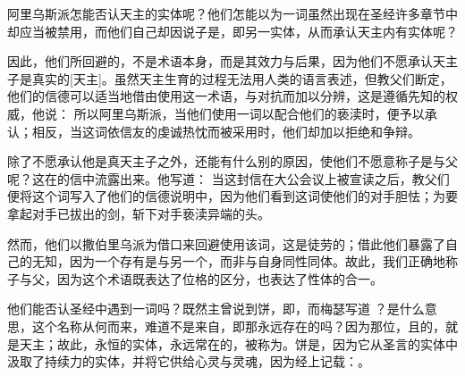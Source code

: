 阿里乌斯派怎能否认天主的实体呢？他们怎能以为一词虽然出现在圣经许多章节中却应当被禁用，而他们自己却因说子是，即另一实体，从而承认天主内有实体呢？\par

因此，他们所回避的，不是术语本身，而是其效力与后果，因为他们不愿承认天主子是真实的[天主]。虽然天主生育的过程无法用人类的语言表述，但教父们断定，他们的信德可以适当地借由使用这一术语，与对抗而加以分辨，这是遵循先知的权威，他说：  所以阿里乌斯派，当他们使用一词以配合他们的亵渎时，便予以承认；相反，当这词依信友的虔诚热忱而被采用时，他们却加以拒绝和争辩。\par

除了不愿承认他是真天主子之外，还能有什么别的原因，使他们不愿意称子是与父呢？这在的信中流露出来。他写道： 当这封信在大公会议上被宣读之后，教父们便将这个词写入了他们的信德说明中，因为他们看到这词使他们的对手胆怯；为要拿起对手已拔出的剑，斩下对手亵渎异端的头。 \par

然而，他们以撒伯里乌派为借口来回避使用该词，这是徒劳的；借此他们暴露了自己的无知，因为一个存有是与另一个，而非与自身同性同体。故此，我们正确地称子与父，因为这个术语既表达了位格的区分，也表达了性体的合一。\par

他们能否认圣经中遇到一词吗？既然主曾说到饼，即，而梅瑟写道 ？是什么意思，这个名称从何而来，难道不是来自，即那永远存在的吗？因为那位，且的，就是天主；故此，永恒的实体，永远常在的，被称为。饼是，因为它从圣言的实体中汲取了持续力的实体，并将它供给心灵与灵魂，因为经上记载：。\par

